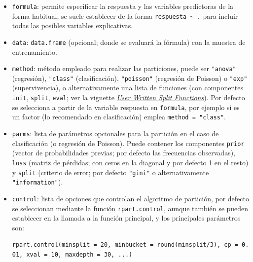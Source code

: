 \documentclass[]{book}
\theoremstyle{break}
\theoremstyle{definition}
\theoremstyle{definition}
\theoremstyle{definition}
\theoremstyle{remark}
\begin{document}
\begin{itemize}
\item
  \texttt{formula}: permite especificar la respuesta y las variables
  predictoras de la forma habitual, se suele establecer de la forma
  \texttt{respuesta\ \textasciitilde{}\ .} para incluir todas las
  posibles variables explicativas.
\item
  \texttt{data}: \texttt{data.frame} (opcional; donde se evaluará la
  fórmula) con la muestra de entrenamiento.
\item
  \texttt{method}: método empleado para realizar las particiones, puede
  ser \texttt{"anova"} (regresión), \texttt{"class"} (clasificación),
  \texttt{"poisson"} (regresión de Poisson) o \texttt{"exp"}
  (supervivencia), o alternativamente una lista de funciones (con
  componentes \texttt{init}, \texttt{split}, \texttt{eval}; ver la
  vignette
  \href{https://cran.r-project.org/web/packages/rpart/vignettes/usercode.pdf}{\emph{User
  Written Split Functions}}). Por defecto se selecciona a partir de la
  variable respuesta en \texttt{formula}, por ejemplo si es un factor
  (lo recomendado en clasificación) emplea \texttt{method\ =\ "class"}.
\item
  \texttt{parms}: lista de parámetros opcionales para la partición en el
  caso de clasificación (o regresión de Poisson). Puede contener los
  componentes \texttt{prior} (vector de probabilidades previas; por
  defecto las frecuencias observadas), \texttt{loss} (matriz de
  pérdidas; con ceros en la diagonal y por defecto 1 en el resto) y
  \texttt{split} (criterio de error; por defecto \texttt{"gini"} o
  alternativamente \texttt{"information"}).
\item
  \texttt{control}: lista de opciones que controlan el algoritmo de
  partición, por defecto se seleccionan mediante la función
  \texttt{rpart.control}, aunque también se pueden establecer en la
  llamada a la función principal, y los principales parámetros son:

  \texttt{rpart.control(minsplit\ =\ 20,\ minbucket\ =\ round(minsplit/3),\ cp\ =\ 0.01,\ xval\ =\ 10,\ maxdepth\ =\ 30,\ ...)}


\end{itemize}
\end{document}
